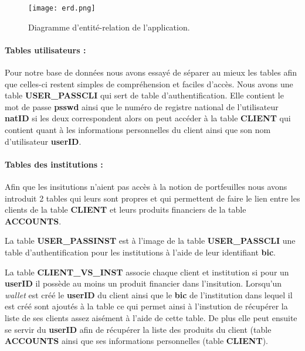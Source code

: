 \documentclass[../rapport.tex]{subfiles}
\begin{document}
	
	\begin{figure}[h]
		\centering \texttt{[image: erd.png]}
		\caption{Diagramme d'entité-relation de l'application.}
	\end{figure}
	
	\paragraph{Tables utilisateurs :}
	Pour notre base de données nous avons essayé de séparer au mieux les tables afin que celles-ci restent simples de compréhension et faciles d'accès. Nous avons une table \textbf{USER\_PASSCLI} qui sert de table d'authentification. Elle contient le mot de passe \textbf{psswd} ainsi que le numéro de registre national de l'utilisateur \textbf{natID} si les deux correspondent alors on peut accéder à la table \textbf{CLIENT} qui contient quant à les informations personnelles du client ainsi que son nom d'utilisateur \textbf{userID}.
	
	\paragraph{Tables des institutions :} Afin que les insitutions n'aient pas accès à la notion de portfeuilles nous avons introduit 2 tables qui leurs sont propres et qui permettent de faire le lien entre les clients de la table \textbf{CLIENT} et leurs produits financiers de la table \textbf{ACCOUNTS}.
	
	\medskip
	
	La table \textbf{USER\_PASSINST} est à l'image de la table \textbf{USER\_PASSCLI} une table d'authentification pour les institutions à l'aide de leur identifiant \textbf{bic}. 
	
	\medskip
	
	La table \textbf{CLIENT\_VS\_INST} associe chaque client et institution si pour un \textbf{userID} il possède au moins un produit financier dans l'insitution. Lorsqu'un \textit{wallet} est créé le \textbf{userID} du client ainsi que le \textbf{bic} de l'institution dans lequel il est créé sont ajoutés à la table ce qui permet ainsi à l'instution de récupérer la liste de ses clients assez aisément à l'aide de cette table. De plus elle peut ensuite se servir du \textbf{userID} afin de récupérer la liste des produits du client (table \textbf{ACCOUNTS} ainsi que ses informations personnelles (table \textbf{CLIENT}).
	
\end{document}
